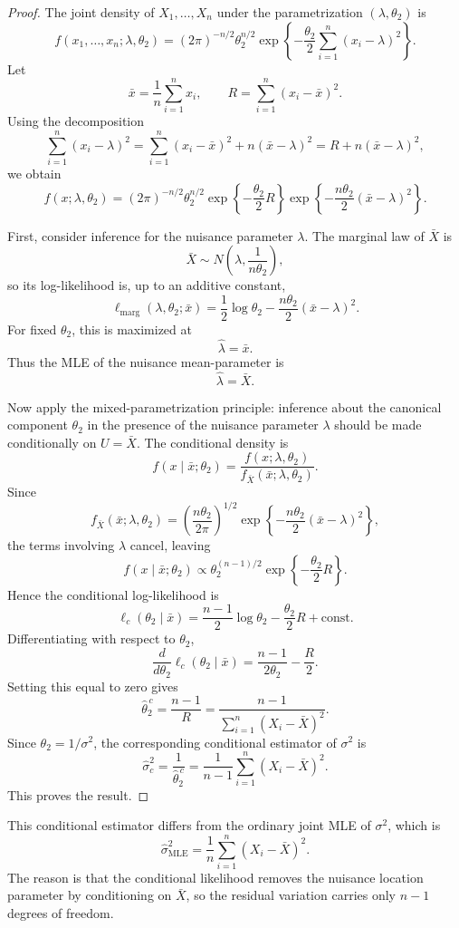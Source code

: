 \begin{proof}
The joint density of $X_1,\dots,X_n$ under the parametrization $(\lambda,\theta_2)$ is
\[
f(x_1,\dots,x_n;\lambda,\theta_2)
=
(2\pi)^{-n/2}\theta_2^{n/2}
\exp\!\left\{-\frac{\theta_2}{2}\sum_{i=1}^n (x_i-\lambda)^2\right\}.
\]
Let
\[
\bar x=\frac1n\sum_{i=1}^n x_i,
\qquad
R=\sum_{i=1}^n (x_i-\bar x)^2.
\]
Using the decomposition
\[
\sum_{i=1}^n (x_i-\lambda)^2
=
\sum_{i=1}^n (x_i-\bar x)^2+n(\bar x-\lambda)^2
=
R+n(\bar x-\lambda)^2,
\]
we obtain
\[
f(x;\lambda,\theta_2)
=
(2\pi)^{-n/2}\theta_2^{n/2}
\exp\!\left\{-\frac{\theta_2}{2}R\right\}
\exp\!\left\{-\frac{n\theta_2}{2}(\bar x-\lambda)^2\right\}.
\]

First, consider inference for the nuisance parameter $\lambda$. The marginal law of $\bar X$ is
\[
\bar X\sim N\!\left(\lambda,\frac{1}{n\theta_2}\right),
\]
so its log-likelihood is, up to an additive constant,
\[
\ell_{\mathrm{marg}}(\lambda,\theta_2;\bar x)
=
\frac12\log\theta_2-\frac{n\theta_2}{2}(\bar x-\lambda)^2.
\]
For fixed $\theta_2$, this is maximized at
\[
\hat\lambda=\bar x.
\]
Thus the MLE of the nuisance mean-parameter is
\[
\hat\lambda=\bar X.
\]

Now apply the mixed-parametrization principle: inference about the canonical component $\theta_2$ in the presence of the nuisance parameter $\lambda$ should be made conditionally on $U=\bar X$. The conditional density is
\[
f(x\mid \bar x;\theta_2)
=
\frac{f(x;\lambda,\theta_2)}{f_{\bar X}(\bar x;\lambda,\theta_2)}.
\]
Since
\[
f_{\bar X}(\bar x;\lambda,\theta_2)
=
\left(\frac{n\theta_2}{2\pi}\right)^{1/2}
\exp\!\left\{-\frac{n\theta_2}{2}(\bar x-\lambda)^2\right\},
\]
the terms involving $\lambda$ cancel, leaving
\[
f(x\mid \bar x;\theta_2)
\propto
\theta_2^{(n-1)/2}
\exp\!\left\{-\frac{\theta_2}{2}R\right\}.
\]
Hence the conditional log-likelihood is
\[
\ell_c(\theta_2\mid \bar x)
=
\frac{n-1}{2}\log\theta_2-\frac{\theta_2}{2}R+\text{const}.
\]
Differentiating with respect to $\theta_2$,
\[
\frac{d}{d\theta_2}\ell_c(\theta_2\mid \bar x)
=
\frac{n-1}{2\theta_2}-\frac{R}{2}.
\]
Setting this equal to zero gives
\[
\hat\theta_2^{\,c}
=
\frac{n-1}{R}
=
\frac{n-1}{\sum_{i=1}^n (X_i-\bar X)^2}.
\]
Since $\theta_2=1/\sigma^2$, the corresponding conditional estimator of $\sigma^2$ is
\[
\hat\sigma_c^2
=
\frac{1}{\hat\theta_2^{\,c}}
=
\frac{1}{n-1}\sum_{i=1}^n (X_i-\bar X)^2.
\]
This proves the result.
\end{proof}

\begin{remark}
This conditional estimator differs from the ordinary joint MLE of $\sigma^2$, which is
\[
\hat\sigma^2_{\mathrm{MLE}}
=
\frac{1}{n}\sum_{i=1}^n (X_i-\bar X)^2.
\]
The reason is that the conditional likelihood removes the nuisance location parameter by conditioning on $\bar X$, so the residual variation carries only $n-1$ degrees of freedom.
\end{remark}
